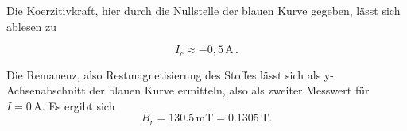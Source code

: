   Die Koerzitivkraft, hier durch die Nullstelle der blauen Kurve gegeben, lässt sich ablesen zu

  \begin{equation*}
    I_c \approx -0,5 \, \unit{\ampere} \,.
  \end{equation*}

  Die Remanenz, also Restmagnetisierung des Stoffes lässt sich als y-Achsenabschnitt der blauen Kurve ermitteln, also
  als zweiter Messwert für $I=0 \, \unit{\ampere}$.
  Es ergibt sich
  \begin{equation*}
    B_r = 130.5 \, \unit{\milli\tesla} = 0.1305 \, \unit{\tesla}. 
  \end{equation*}
